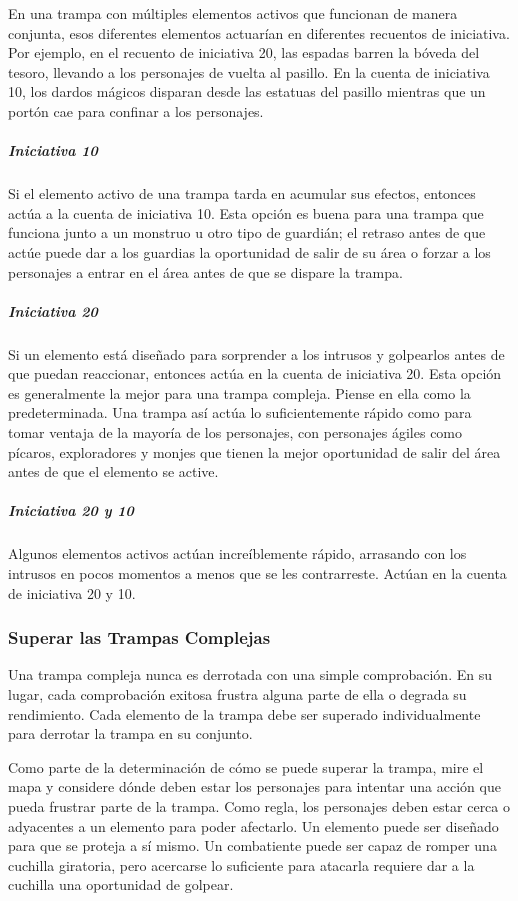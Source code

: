 \documentclass[a4paper,twocolumn,openany,10pt]{dndbook}
\begin{document}
En una trampa con múltiples elementos activos que funcionan de manera conjunta, esos diferentes elementos actuarían en
diferentes recuentos de iniciativa. Por ejemplo, en el recuento de iniciativa 20, las espadas barren la bóveda del tesoro,
llevando a los personajes de vuelta al pasillo. En la cuenta de iniciativa 10, los dardos mágicos disparan desde las estatuas
del pasillo mientras que un portón cae para confinar a los personajes.

\subparagraph{Iniciativa 10} Si el elemento activo de una trampa tarda en acumular sus efectos, entonces actúa a la cuenta de
iniciativa 10. Esta opción es buena para una trampa que funciona junto a un monstruo u otro tipo de guardián; el retraso antes
de que actúe puede dar a los guardias la oportunidad de salir de su área o forzar a los personajes a entrar en el área antes de
que se dispare la trampa.

\subparagraph{Iniciativa 20} Si un elemento está diseñado para sorprender a los intrusos y golpearlos antes de que puedan
reaccionar, entonces actúa en la cuenta de iniciativa 20. Esta opción es generalmente la mejor para una trampa compleja. Piense
en ella como la predeterminada. Una trampa así actúa lo suficientemente rápido como para tomar ventaja de la mayoría de los
personajes, con personajes ágiles como pícaros, exploradores y monjes que tienen la mejor oportunidad de salir del área antes de
que el elemento se active.

\subparagraph{Iniciativa 20 y 10} Algunos elementos activos actúan increíblemente rápido, arrasando con los intrusos en pocos
momentos a menos que se les contrarreste. Actúan en la cuenta de iniciativa 20 y 10. 

\subsubsection*{Superar las Trampas Complejas}
Una trampa compleja nunca es derrotada con una simple comprobación. En su lugar, cada comprobación exitosa frustra alguna parte
de ella o degrada su rendimiento. Cada elemento de la trampa debe ser superado individualmente para derrotar la trampa en su
conjunto.

Como parte de la determinación de cómo se puede superar la trampa, mire el mapa y considere dónde deben estar los personajes
para intentar una acción que pueda frustrar parte de la trampa. Como regla, los personajes deben estar cerca o adyacentes a un
elemento para poder afectarlo. Un elemento puede ser diseñado para que se proteja a sí mismo. Un combatiente puede ser capaz de
romper una cuchilla giratoria, pero acercarse lo suficiente para atacarla requiere dar a la cuchilla una oportunidad de golpear.
\end{document}
